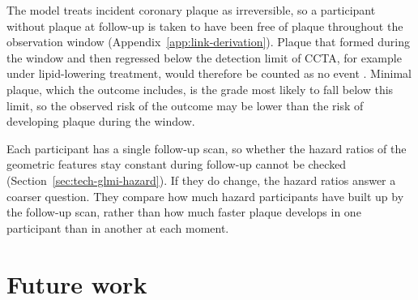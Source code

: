 The model treats incident coronary plaque as irreversible, so a participant without plaque at follow-up is taken to have been free of plaque throughout the observation window (Appendix~\ref{app:link-derivation}).
Plaque that formed during the window and then regressed below the detection limit of CCTA, for example under lipid-lowering treatment, would therefore be counted as no event .
Minimal plaque, which the outcome includes, is the grade most likely to fall below this limit, so the observed risk of the outcome may be lower than the risk of developing plaque during the window.

Each participant has a single follow-up scan, so whether the hazard ratios of the geometric features stay constant during follow-up cannot be checked (Section~\ref{sec:tech-glmi-hazard}).
If they do change, the hazard ratios answer a coarser question.
They compare how much hazard participants have built up by the follow-up scan, rather than how much faster plaque develops in one participant than in another at each moment.

\section{Future work}
